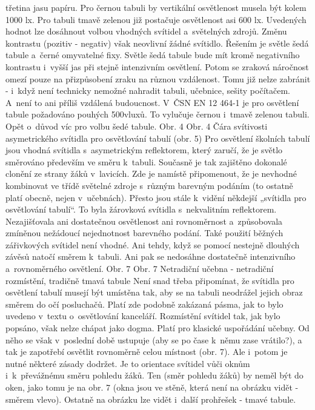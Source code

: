 třetina jasu papíru. Pro černou tabuli by vertikální osvětlenost musela být kolem 1000 lx.
Pro tabuli tmavě zelenou již postačuje osvětlenost asi 600 lx. Uvedených hodnot lze dosáhnout
volbou vhodných svítidel a~světelných zdrojů. Změnu kontrastu (pozitiv - negativ) však
neovlivní žádné svítidlo. Řešením je světle šedá tabule a~černé omyvatelné fixy.
Světle šedá tabule bude mít kromě negativního kontrastu i~vyšší jas při stejně intenzivním osvětlení.
 Potom se zraková náročnost omezí pouze na přizpůsobení zraku na různou vzdálenost.
 Tomu již nelze zabránit - i~když není technicky nemožné nahradit tabuli, učebnice, sešity počítačem.
 A~není to ani příliš vzdálená budoucnost.
\medskip
V~ČSN EN 12 464-1 je pro osvětlení tabule požadováno pouhých 500vluxů. To vylučuje černou i~tmavě zelenou tabuli.
 Opět o~důvod víc pro volbu šedé tabule.
Obr. 4
Obr. 4 Čára svítivosti asymetrického svítidla pro osvětlování tabulí (obr. 5)
\medskip
Pro osvětlení školních tabulí jsou vhodná svítidla s~asymetrickým reflektorem, který zaručí,
že je světlo směrováno především ve směru k~tabuli. Současně je tak zajištěno dokonalé clonění
ze strany žáků v~lavicích.
\medskip
Zde je namístě připomenout, že je nevhodné kombinovat ve třídě světelné zdroje s~různým barevným podáním
(to ostatně platí obecně, nejen v~učebnách). Přesto jsou stále k~vidění někdejší „svítidla pro osvětlování tabulí“.
 To byla žárovková svítidla s~nekvalitním reflektorem. Nezajišťovala ani dostatečnou osvětlenost
 ani rovnoměrnost a~způsobovala zmíněnou nežádoucí nejednotnost barevného podání.
\medskip
Také použití běžných zářivkových svítidel není vhodné. Ani tehdy, když se pomocí nestejně
dlouhých závěsů natočí směrem k~tabuli. Ani pak se nedosáhne dostatečně intenzivního a~rovnoměrného osvětlení.
Obr. 7
Obr. 7 Netradiční učebna - netradiční rozmístění, tradičně tmavá tabule
\medskip
Není snad třeba připomínat, že svítidla pro osvětlení tabulí musejí být umístěna tak, aby se
na tabuli neodrážel jejich obraz směrem do očí posluchačů. Platí zde podobně zakázaná pásma,
jak to bylo uvedeno v~textu o~osvětlování kanceláří.
\medskip
Rozmístění svítidel tak, jak bylo popsáno, však nelze chápat jako dogma. Platí pro klasické
uspořádání učebny. Od něho se však v~poslední době ustupuje (aby se po čase k~němu zase vrátilo?),
a tak je zapotřebí osvětlit rovnoměrně celou místnost (obr. 7).
\medskip
Ale i~potom je nutné některé zásady dodržet. Je to orientace svítidel vůči oknům i~k~převážnému směru
pohledu žáků. Ten (směr pohledu žáků) by neměl být do oken, jako tomu je na obr. 7 (okna jsou ve stěně,
která není na obrázku vidět - směrem vlevo). Ostatně na obrázku lze vidět i~další prohřešek - tmavé tabule.